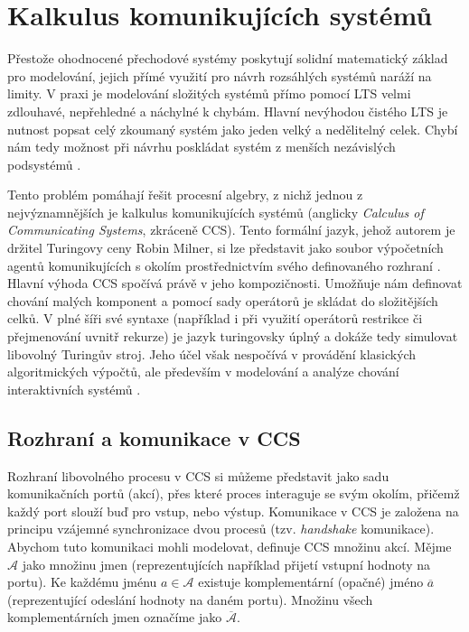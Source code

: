 \section{Kalkulus komunikujících systémů}
\label{sec:ccs}
Přestože ohodnocené přechodové systémy poskytují solidní matematický základ pro modelování, jejich přímé využití pro návrh rozsáhlých systémů naráží na limity. 
V praxi je modelování složitých systémů přímo pomocí LTS velmi zdlouhavé, nepřehledné a náchylné k chybám. 
Hlavní nevýhodou čistého LTS je nutnost popsat celý zkoumaný systém jako jeden velký a nedělitelný celek. 
Chybí nám tedy možnost při návrhu poskládat systém z menších nezávislých podsystémů \cite{aceto2007reactive}.

Tento problém pomáhají řešit procesní algebry, z nichž jednou z nejvýznamnějších je kalkulus komunikujících systémů (anglicky \textit{Calculus of Communicating Systems}, zkráceně CCS). 
Tento formální jazyk, jehož autorem je držitel Turingovy ceny Robin Milner, 
si lze představit jako soubor výpočetních agentů komunikujících s okolím prostřednictvím svého definovaného rozhraní \cite{milner1989communication}.
Hlavní výhoda CCS spočívá právě v jeho kompozičnosti. 
Umožňuje nám definovat chování malých komponent a pomocí sady operátorů je skládat do složitějších celků.
V plné šíři své syntaxe (například i při využití operátorů restrikce či přejmenování uvnitř rekurze) je jazyk turingovsky úplný a dokáže tedy simulovat libovolný Turingův stroj.
Jeho účel však nespočívá v provádění klasických algoritmických výpočtů, ale především v modelování a analýze chování interaktivních systémů \cite{presentation1}.

\subsection{Rozhraní a komunikace v CCS}
Rozhraní libovolného procesu v CCS si můžeme představit jako sadu komunikačních portů (akcí), přes které proces interaguje se svým okolím, přičemž každý port slouží buď pro vstup, nebo výstup.
Komunikace v CCS je založena na principu vzájemné synchronizace dvou procesů (tzv. \textit{handshake} komunikace). 
Abychom tuto komunikaci mohli modelovat, definuje CCS množinu akcí. Mějme $\mathcal{A}$ jako množinu jmen (reprezentujících například přijetí vstupní hodnoty na portu). 
Ke každému jménu $a \in \mathcal{A}$ existuje komplementární (opačné) jméno $\overline{a}$ (reprezentující odeslání hodnoty na daném portu). 
Množinu všech komplementárních jmen označíme jako $\overline{\mathcal{A}}$. 

